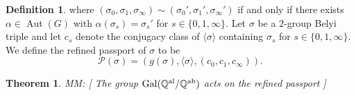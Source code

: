 \documentclass{dcthesis}
\newcommand{\defi}[1]{\textsf{#1}}
\newcommand{\mm}[1]{{\color{blue} \sf MM: [#1]}}
\newcommand{\QQal}{{\mathbb Q}^{\textup{al}}}
\newcommand{\QQab}{{\mathbb Q}^{\textup{ab}}}
\DeclareMathOperator{\Aut}{Aut}
\DeclareMathOperator{\Gal}{Gal}
\numberwithin{equation}{section}
\newtheorem{theorem}[equation]{Theorem}
\theoremstyle{definition}
\newtheorem{definition}[equation]{Definition}
\theoremstyle{remark}
\begin{document}
{{\begin{definition}
      where $(\sigma_0,\sigma_1,\sigma_\infty)\sim(\sigma_0', \sigma_1', \sigma_\infty')$
      if and only if there exists $\alpha\in\Aut(G)$ with
      $\alpha(\sigma_s) = \sigma_s'$ for $s\in\{0,1,\infty\}$.
      Let $\sigma$ be a $2$-group Belyi triple
      and let $c_s$ denote the conjugacy
      class of $\langle\sigma\rangle$
      containing $\sigma_s$ for
      $s\in \{0,1,\infty\}$.
      We define the
      \defi{refined passport of $\sigma$}
      to be
      \begin{equation}
        \label{eqn:refinedpassportofsigma}
        \mathscr{P}(\sigma)
        =(g(\sigma), \langle\sigma\rangle, (c_0,c_1,c_\infty)).
      \end{equation}
    \end{definition}
    \begin{theorem}
      \label{thm:refinedsizebounds}
      \mm{
        The group $\Gal(\QQal/\QQab)$ acts on the refined passport
      }
    \end{theorem}
  }
}
\end{document}
